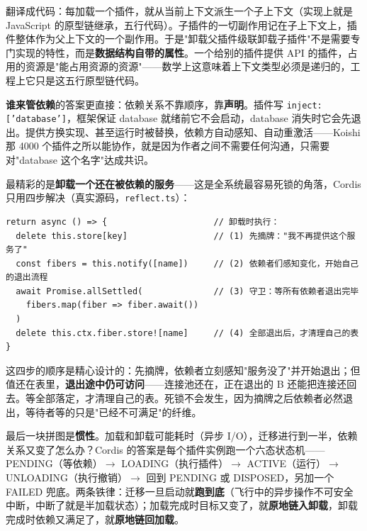 \documentclass[11pt,a4paper]{article}
\begin{document}
\begin{center}

\end{center}

翻译成代码：每加载一个插件，就从当前上下文派生一个子上下文（实现上就是 JavaScript 的原型链继承，五行代码）。子插件的一切副作用记在子上下文上，插件整体作为父上下文的一个副作用。于是"卸载父插件级联卸载子插件"不是需要专门实现的特性，而是\textbf{数据结构自带的属性}。一个给别的插件提供 API 的插件，占用的资源是"能占用资源的资源"——数学上这意味着上下文类型必须是递归的，工程上它只是这五行原型链代码。

\textbf{谁来管依赖}的答案更直接：依赖关系不靠顺序，靠\textbf{声明}。插件写 \texttt{inject: ['database']}，框架保证 database 就绪前它不会启动，database 消失时它会先退出。提供方换实现、甚至运行时被替换，依赖方自动感知、自动重激活——Koishi 那 4000 个插件之所以能协作，就是因为作者之间不需要任何沟通，只需要对"database 这个名字"达成共识。

最精彩的是\textbf{卸载一个还在被依赖的服务}——这是全系统最容易死锁的角落，Cordis 只用四步解决（真实源码，\texttt{reflect.ts}）：

\begin{lstlisting}
return async () => {                     // 卸载时执行：
  delete this.store[key]                 // (1) 先摘牌："我不再提供这个服务了"
  const fibers = this.notify([name])     // (2) 依赖者们感知变化，开始自己的退出流程
  await Promise.allSettled(              // (3) 守卫：等所有依赖者退出完毕
    fibers.map(fiber => fiber.await())
  )
  delete this.ctx.fiber.store![name]     // (4) 全部退出后，才清理自己的表
}
\end{lstlisting}

\begin{center}

\end{center}

这四步的顺序是精心设计的：先摘牌，依赖者立刻感知"服务没了"并开始退出；但值还在表里，\textbf{退出途中仍可访问}——连接池还在，正在退出的 B 还能把连接还回去。等全部落定，才清理自己的表。死锁不会发生，因为摘牌之后依赖者必然退出，等待者等的只是"已经不可满足"的纤维。

最后一块拼图是\textbf{惯性}。加载和卸载可能耗时（异步 I/O），迁移进行到一半，依赖关系又变了怎么办？Cordis 的答案是每个插件实例跑一个六态状态机——PENDING（等依赖）$\to$ LOADING（执行插件）$\to$ ACTIVE（运行）$\to$ UNLOADING（执行撤销）$\to$ 回到 PENDING 或 DISPOSED，另加一个 FAILED 兜底。两条铁律：迁移一旦启动就\textbf{跑到底}（飞行中的异步操作不可安全中断，中断了就是半加载状态）；加载完成时目标又变了，就\textbf{原地链入卸载}，卸载完成时依赖又满足了，就\textbf{原地链回加载}。
\end{document}
